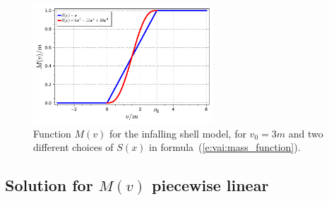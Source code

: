 \begin{figure}
\centerline{\includegraphics[width=0.6\textwidth]{vai_mass_function.pdf}}
\caption[]{\label{f:vai:mass_function} \footnotesize
Function $M(v)$ for the infalling shell model, for $v_0 = 3 m$ and
two different choices of $S(x)$ in formula~(\ref{e:vai:mass_function}).
}
\end{figure}

\subsection{Solution for $M(v)$ piecewise linear} \label{s:vai:sol_M_linear}

